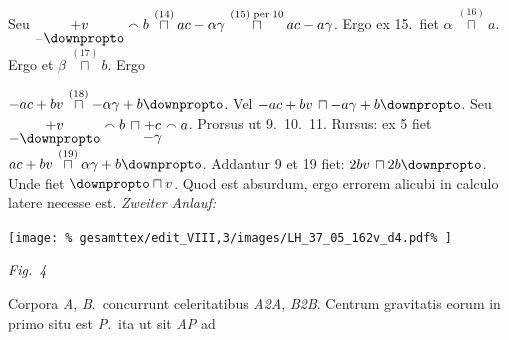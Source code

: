 Seu $\underset{-\protect\rotatebox{0}{$\downpropto$}}{+v}\smallfrown b \,\overset{(14)}\sqcap ac-\alpha\gamma
\,\overset{(15)\; \textrm{per}\; 10}\sqcap ac-a\gamma$. Ergo ex 15.\ fiet $\alpha \,\overset{(16)}\sqcap a$.
Ergo et
%
%
%
$\beta \,\overset{(17)}\sqcap b$.
\pend
%
\pstart
Ergo%
%
\rule[0cm]{0mm}{16pt}%
$-ac+bv \,\overset{(18)}\sqcap -\alpha\gamma + b\protect\rotatebox{0}{$\downpropto$}$. 
Vel $-ac+bv \,\sqcap -a\gamma + b\protect\rotatebox{0}{$\downpropto$}$. Seu 
$\underset{{\displaystyle -\protect\rotatebox{0}{$\downpropto$}}}{+v}\smallfrown b \,\sqcap 
\underset{{\displaystyle -\gamma}}{+c}\smallfrown a$.
Prorsus ut 9.\ 10.\ 11. 
Rursus: ex 5 fiet $ac+bv\,\overset{(19)}\sqcap \alpha\gamma + b\protect\rotatebox{0}{$\downpropto$}$. Addantur 9 et 19 fiet: 
$2bv \,\sqcap 2b\protect\rotatebox{0}{$\downpropto$}$. Unde fiet $\protect\rotatebox{0}{$\downpropto$} \sqcap v$. Quod est absurdum, ergo 
errorem alicubi in calculo latere necesse est.
\pend
%
\vspace{0.5em} %
%
\pstart
\noindent
\lbrack%
%
\textit{Zweiter Anlauf:}\rbrack %
\pend
%
\vspace{2.0em} %
\centerline{%
\texttt{[image: \%
gesamttex/edit\_VIII,3/images/LH\_37\_05\_162v\_d4.pdf\%
]}} 
\vspace{0.5em}
\centerline{%
\lbrack\textit{Fig.~4}\rbrack%
}
\newpage%
%
\pstart
\noindent
Corpora \textit{A}, \textit{B}.\ concurrunt celeritatibus \textit{A{\scriptsize2}A}, \textit{B{\scriptsize2}B}. 
%
%
%
%
%
Centrum gravitatis%
\protect{} eorum in primo situ est \textit{P}.\ ita ut sit \textit{AP} ad 
